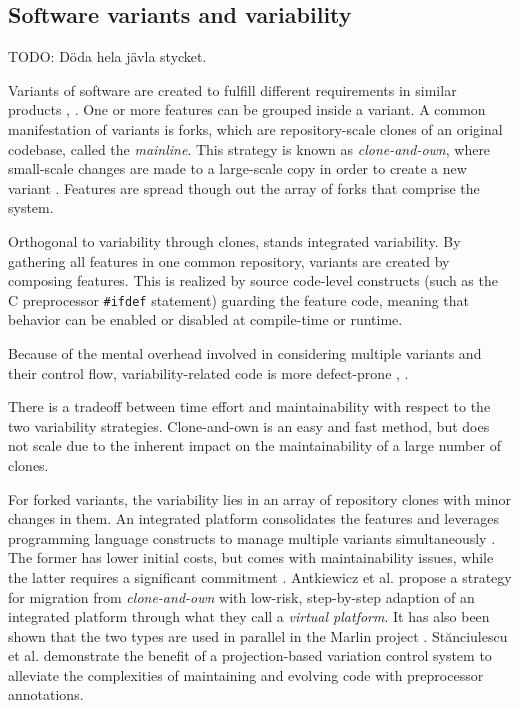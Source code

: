 \subsection{Software variants and variability}
TODO: Döda hela jävla stycket.

Variants of software are created to fulfill different requirements in similar products \cite{antkiewicz2014flexible}, \cite{stanciulescu2015}. One or more features can be grouped inside a variant. A common manifestation of variants is forks, which are repository-scale clones of an original codebase, called the \textit{mainline}. This strategy is known as \textit{clone-and-own}, where small-scale changes are made to a large-scale copy in order to create a new variant \cite{stanciulescu2015}. Features are spread though out the array of forks that comprise the system.

Orthogonal to variability through clones, stands integrated variability. By gathering all features in one common repository, variants are created by composing features. This is realized by source code-level constructs (such as the C preprocessor \texttt{\#ifdef} statement) guarding the feature code, meaning that behavior can be enabled or disabled at compile-time or runtime.

Because of the mental overhead involved in considering multiple variants and their control flow, variability-related code is more defect-prone \cite{medeiros2013syntaxerrors}, \cite{melo2016latin}.

There is a tradeoff between time effort and maintainability with respect to the two variability strategies. Clone-and-own is an easy and fast method, but does not scale due to the inherent impact on the maintainability of a large number of clones.

For forked variants, the variability lies in an array of repository clones with minor changes in them. An integrated platform consolidates the features and leverages programming language constructs to manage multiple variants simultaneously \cite{stanciulescu2015}. The former has lower initial costs, but comes with maintainability issues, while the latter requires a significant commitment \cite{antkiewicz2014flexible}. Antkiewicz et al. \cite{antkiewicz2014flexible} propose a strategy for migration from \textit{clone-and-own} with low-risk, step-by-step adaption of an integrated platform through what they call a \textit{virtual platform}. It has also been shown that the two types are used in parallel in the Marlin project \cite{stanciulescu2015}. St\u{a}nciulescu et al. \cite{stanciulescu2016concepts} demonstrate the benefit of a projection-based variation control system to alleviate the complexities of maintaining and evolving code with preprocessor annotations.

